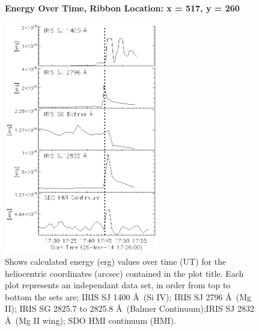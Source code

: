 \begin{figure}[H]
  \begin{center}
  \textbf{Energy Over Time, Ribbon Location: x = 517, y = 260 }\par\medskip
  \includegraphics[width=0.6\textwidth]{29-Mar-14-Ribbon-xyPosition-517-260-Frame-1-Energy-Ladder}
  \end{center}
  \caption{Shows calculated energy (erg) values over time (UT) for the heliocentric coordinates (arcsec) contained in the plot title. Each plot represents an independant data set, in order from top to bottom the sets are; IRIS SJ 1400 \AA\ (Si IV); IRIS SJ 2796 \AA\ (Mg II); IRIS SG  2825.7 to 2825.8 \AA\ (Balmer Continuum);IRIS SJ 2832 \AA\ (Mg II wing); SDO HMI continuum (HMI).}\label{erb1}
\end{figure}

